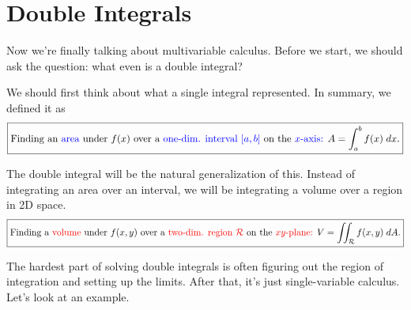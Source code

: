 \documentclass[11 pt]{scrartcl}
\begin{document}
\section{Double Integrals}
Now we're finally talking about multivariable calculus. Before we start, we should ask the question: what even is a double integral? 

We should first think about what a single integral represented. In summary, we defined it as 
\[ \boxed{\text{Finding an \textcolor{blue}{area} under } f(x) \text{ over a \textcolor{blue}{one-dim. interval} } {\color{blue} [a,b]} \text{ on the } {\color{blue} x \text{-axis: }} A = \int_a^b f(x) \; dx.}\] 

The double integral will be the natural generalization of this. Instead of integrating an area over an interval, we will be integrating a volume over a region in 2D space. 
\[ \boxed{\text{Finding a \textcolor{red}{volume} under } f(x,y) \text{ over a \textcolor{red}{two-dim. region} } {\color{red} \mathcal{R}} \text{ on the } {\color{red} xy \text{-plane: }} V = \iint_\mathcal{R} f(x,y) \; dA.}\] 

The hardest part of solving double integrals is often figuring out the region of integration and setting up the limits. After that, it's just single-variable calculus. Let's look at an example. 
\end{document}
